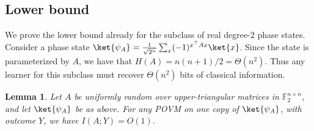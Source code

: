 \documentclass[11pt]{article}
\newtheorem{lemma}[theorem]{Lemma}
\newcommand{\F}{\mathbb{F}}
\begin{document}
\subsection{Lower bound}
\label{sec:learning-lower-bound}

We prove the lower bound already for the subclass of real degree-$2$ phase states.  Consider a phase state $\ket{\psi_A}=\frac{1}{\sqrt{2^n}}\sum_x (-1)^{x^\top A x}\ket{x}$. 
Since the state is parameterized by $A$, we have that
$
    H(A)={n(n+1)}/2=\Theta(n^2).
$
Thus any learner for this subclass must recover $\Theta(n^2)$ bits of classical
information.

\begin{lemma}
\label{lem:one-copy-quadratic-info}
Let $A$ be uniformly random over upper-triangular matrices in
$\F_2^{n\times n}$, and let $\ket{\psi_A}$ be as above.  For any POVM on one
copy of $\ket{\psi_A}$, with outcome $Y$, we have
$
    I(A;Y)=O(1).
$
\end{lemma}
\end{document}
